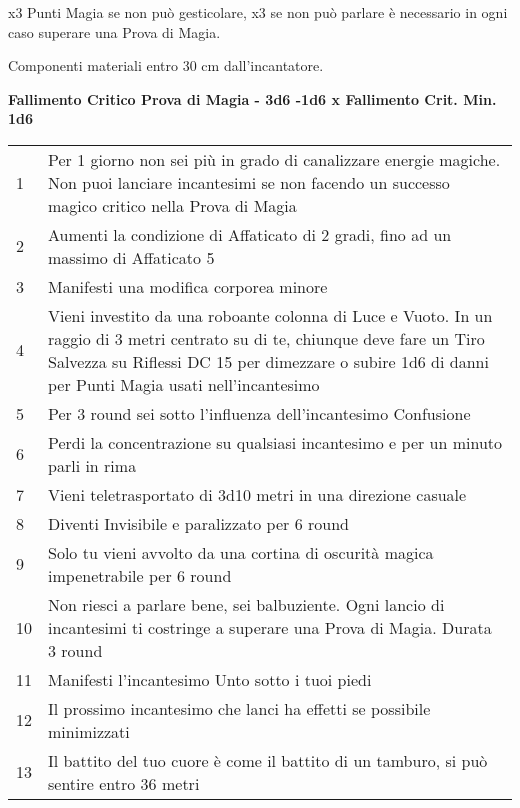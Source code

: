 \documentclass[landscape,10pt,a4paper]{article}
\begin{document}
\begin{multicols}{2}
\begin{dmbox}[title=Tentare Incantesimi con impedimenti - pagina \pageref{magieconimpedimenti}]

	x3 Punti Magia se non può gesticolare, x3 se non può parlare è necessario in ogni caso superare una Prova di Magia.

	Componenti materiali entro 30 cm dall'incantatore.
\end{dmbox}

\begin{dmbox}[title=Fallimento Critico Prova di Magia - pagina \pageref{magiefallimentocriticonellaprovadimagia}]

\textbf{Fallimento Critico Prova di Magia - 3d6 -1d6 x Fallimento Crit. Min. 1d6}
\begin{tabularx}{1\linewidth}{lX}
1 & Per 1 giorno non sei più in grado di canalizzare energie magiche. Non puoi lanciare incantesimi se non facendo un successo magico critico nella Prova di Magia\\
2 & Aumenti la condizione di Affaticato di 2 gradi, fino ad un massimo di Affaticato 5\\
3 & Manifesti una modifica corporea minore\\
4 & Vieni investito da una roboante colonna di Luce e Vuoto. In un raggio di 3 metri centrato su di te, chiunque deve fare un Tiro Salvezza su Riflessi DC 15 per dimezzare o subire 1d6 di danni per Punti Magia usati nell'incantesimo\\
5 & Per 3 round sei sotto l'influenza dell'incantesimo Confusione\\
6 & Perdi la concentrazione su qualsiasi incantesimo e per un minuto parli in rima\\
7 & Vieni teletrasportato di 3d10 metri in una direzione casuale\\
8 & Diventi Invisibile e paralizzato per 6 round\\
9 & Solo tu vieni avvolto da una cortina di oscurità magica impenetrabile per 6 round\\
10 & Non riesci a parlare bene, sei balbuziente. Ogni lancio di incantesimi ti costringe a superare una Prova di Magia. Durata 3 round\\
11 & Manifesti l'incantesimo Unto sotto i tuoi piedi\\
12 & Il prossimo incantesimo che lanci ha effetti se possibile minimizzati\\
13 & Il battito del tuo cuore è come il battito di un tamburo, si può sentire entro 36 metri\\

\end{tabularx}
\end{dmbox}
\end{multicols}
\end{document}
